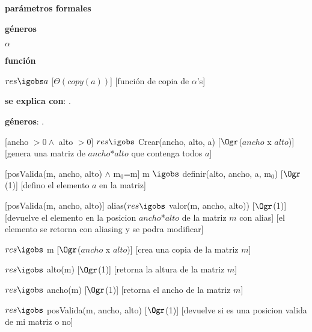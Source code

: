 \begin{Interfaz}

	\textbf{parámetros formales}\parindent\\
	\parbox{1.7cm}{\textbf{géneros}} $\alpha$\\	\parbox[t]{1.7cm}{\textbf{función}}\parbox[t]{\textwidth-2\parindent-1.7cm}{%
	{$res \igobs a$}
	[$\Theta(copy(a))$]
	[función de copia de $\alpha$'s]
	}

	\textbf{se explica con}: .

	\textbf{géneros}: .


	[ancho $> 0 \land$ alto $>0$]
	{$res \igobs$ Crear(ancho, alto, a)}
	[$\Ogr$($ancho$ x $alto$)]
	[genera una matriz de $ancho$*$alto$ que contenga todos $a$]

	[posValida(m, ancho, alto) $\land$ m$_0$=m]
	{m $\igobs$ definir(alto, ancho, a, m$_0$)}
	[$\Ogr$(1)]
	[defino el elemento $a$ en la matriz]
	
	[posValida(m, ancho, alto)]
	{alias($res \igobs$ valor(m, ancho, alto))}
	[$\Ogr$(1)]
	[devuelve el elemento en la posicion $ancho$*$alto$ de la matriz $m$ con alias]
	[el elemento se retorna con aliasing y se podra modificar]

	{$res \igobs$ m}  
	[$\Ogr$($ancho$ x $alto$)]
	[crea una copia de la matriz $m$]

	{$res \igobs$ alto(m)}  
	[$\Ogr$(1)]
	[retorna la altura de la matriz $m$]

	{$res \igobs$ ancho(m)}  
	[$\Ogr$(1)]
	[retorna el ancho de la matriz $m$]

	{$res \igobs$ posValida(m, ancho, alto)}  
	[$\Ogr$(1)]
	[devuelve si es una posicion valida de mi matriz o no]
	
\end{Interfaz}

